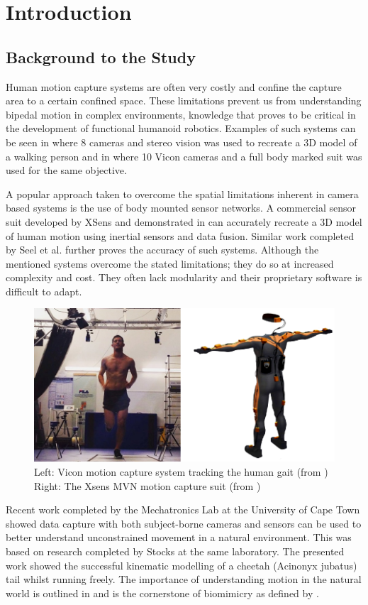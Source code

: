 \chapter{Introduction}

\section{Background to the Study}
Human motion capture systems are often very costly and confine the capture area to a certain confined space. These limitations prevent us from understanding bipedal motion in complex environments, knowledge that proves to be critical in the development of functional humanoid robotics. Examples of such systems can be seen in \cite{sandau2014markerless} where 8 cameras and stereo vision was used to recreate a 3D model of a walking person and in \cite{pfister2014comparative} where 10 Vicon cameras and a full body marked suit was used for the same objective.

A popular approach taken to overcome the spatial limitations inherent in camera based systems is the use of body mounted sensor networks. A commercial sensor suit developed by XSens and demonstrated in \cite{roetenberg2009xsens} can accurately recreate a 3D model of human motion using inertial sensors and data fusion. Similar work completed by Seel et al. \cite{seel2014imu} further proves the accuracy of such systems. Although the mentioned systems overcome the stated limitations; they do so at increased complexity and cost. They often lack modularity and their proprietary software is difficult to adapt.

\begin{figure}[!ht] 
\captionsetup{width=0.8\linewidth, font=small}  
\includegraphics[width=0.5\linewidth]{figures/COMBO.png}
\caption{Left: Vicon motion capture system tracking the human gait (from \cite{roetenberg2009xsens}) Right: The Xsens MVN motion capture suit (from \cite{vicon})}
\label{fig:COMBO}
\end{figure}

Recent work \cite{patel2017trackingieee} completed by the Mechatronics Lab at the University of Cape Town showed data capture with both subject-borne cameras and sensors can be used to better understand unconstrained movement in a natural environment. This was based on research completed by Stocks \cite{bradstocks} at the same laboratory. The presented work showed the successful kinematic modelling of a cheetah (Acinonyx jubatus) tail whilst running freely. The importance of understanding motion in the natural world is outlined in \cite{patel2014rapid} and is the cornerstone of biomimicry as defined by \cite{benyus2002biomimicry}.

